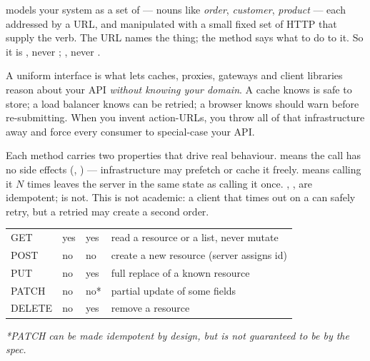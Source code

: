 

  models your system as a set of  --- nouns like \emph{order}, \emph{customer}, \emph{product} --- each addressed by a URL, and manipulated with a small fixed set of HTTP  that supply the verb. The URL names the thing; the method says what to do to it. So it is , never ; , never .

 A uniform interface is what lets caches, proxies, gateways and client libraries reason about your API \emph{without knowing your domain}. A cache knows  is safe to store; a load balancer knows  can be retried; a browser knows  should warn before re-submitting. When you invent action-URLs, you throw all of that infrastructure away and force every consumer to special-case your API.

 Each method carries two properties that drive real behaviour.  means the call has no side effects (, ) --- infrastructure may prefetch or cache it freely.  means calling it $N$ times leaves the server in the same state as calling it once. , ,  are idempotent;  is not. This is not academic: a client that times out on a  can safely retry, but a retried  may create a second order.

\begin{center}\small
\begin{tabularx}{\linewidth}{@{}L{16mm} C{14mm} C{18mm} X@{}}
 &  &  & \\\midrule
GET & yes & yes & read a resource or a list, never mutate\\
POST & no & no & create a new resource (server assigns id)\\
PUT & no & yes & full replace of a known resource\\
PATCH & no & no* & partial update of some fields\\
DELETE & no & yes & remove a resource\\
\end{tabularx}\end{center}
\vspace{-1mm}
{\footnotesize\itshape\color{cInk!68}*PATCH can be made idempotent by design, but is not guaranteed to be by the spec.}

